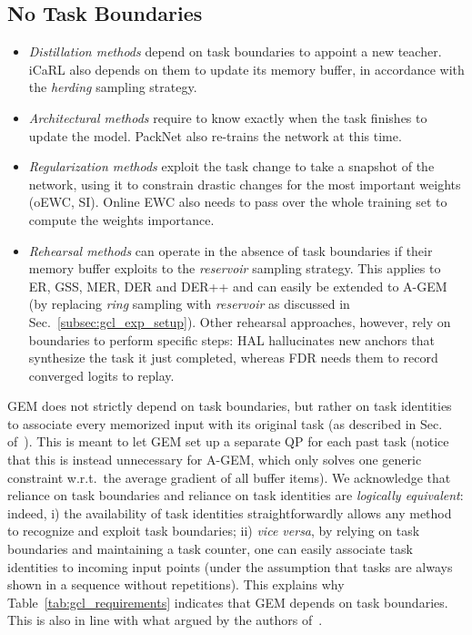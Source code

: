 \documentclass{article}
\begin{document}
\subsection{No Task Boundaries}
\begin{itemize}
        \item \textit{Distillation methods} depend on task boundaries to appoint a new teacher. iCaRL also depends on them to update its memory buffer, in accordance with the \textit{herding} sampling strategy.
        \item \textit{Architectural methods} require to know exactly when the task finishes to update the model. PackNet also re-trains the network at this time.
        \item \textit{Regularization methods} exploit the task change to take a snapshot of the network, using it to constrain drastic changes for the most important weights (oEWC, SI). Online EWC also needs to pass over the whole training set to compute the weights importance.
\item \textit{Rehearsal methods} can operate in the absence of task boundaries if their memory buffer exploits to the \textit{reservoir} sampling strategy. This applies to ER, GSS, MER, DER and DER++ and can easily be extended to A-GEM (by replacing \textit{ring} sampling with \textit{reservoir} as discussed in Sec.~\ref{subsec:gcl_exp_setup}). Other rehearsal approaches, however, rely on boundaries to perform specific steps: HAL hallucinates new anchors that synthesize the task it just completed, whereas FDR needs them to record converged logits to replay.
    \end{itemize}
    GEM does not strictly depend on task boundaries, but rather on task identities to associate every memorized input with its original task (as described in Sec.~ of~\cite{lopez2017gradient}). This is meant to let GEM set up a separate QP for each past task (notice that this is instead unnecessary for A-GEM, which only solves one generic constraint w.r.t.\ the average gradient of all buffer items). We acknowledge that reliance on task boundaries and reliance on task identities are \textit{logically equivalent}: indeed, i) the availability of task identities straightforwardly allows any method to recognize and exploit task boundaries; ii) \textit{vice versa}, by relying on task boundaries and maintaining a task counter, one can easily associate task identities to incoming input points (under the assumption that tasks are always shown in a sequence without repetitions). This explains why Table~\ref{tab:gcl_requirements} indicates that GEM depends on task boundaries. This is also in line with what argued by the authors of~\cite{aljundi2019gradient}.
    
\end{document}
